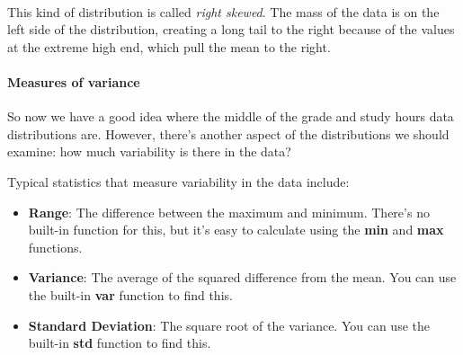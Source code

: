 \documentclass[11pt]{article}
\providecommand{\tightlist}{%
      \setlength{\itemsep}{0pt}\setlength{\parskip}{0pt}}
\begin{document}
    \begin{center}
    \end{center}
    { \hspace*{\fill} \\}
    
    This kind of distribution is called \emph{right skewed}. The mass of the
data is on the left side of the distribution, creating a long tail to
the right because of the values at the extreme high end, which pull the
mean to the right.

\hypertarget{measures-of-variance}{%
\paragraph{Measures of variance}\label{measures-of-variance}}

So now we have a good idea where the middle of the grade and study hours
data distributions are. However, there's another aspect of the
distributions we should examine: how much variability is there in the
data?

Typical statistics that measure variability in the data include:

\begin{itemize}
\tightlist
\item
  \textbf{Range}: The difference between the maximum and minimum.
  There's no built-in function for this, but it's easy to calculate
  using the \textbf{min} and \textbf{max} functions.
\item
  \textbf{Variance}: The average of the squared difference from the
  mean. You can use the built-in \textbf{var} function to find this.
\item
  \textbf{Standard Deviation}: The square root of the variance. You can
  use the built-in \textbf{std} function to find this.
\end{itemize}
\end{document}
